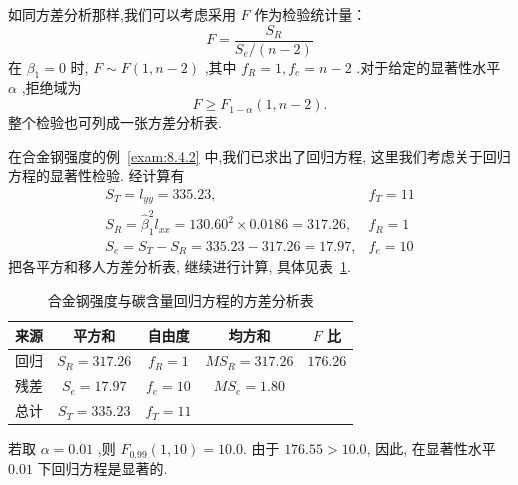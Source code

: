 如同方差分析那样,我们可以考虑采用 $F$ 作为检验统计量：
\begin{equation*}
F=\frac{S_{R}}{S_{e} /(n-2)}
\end{equation*}
在 $\beta_1=0$ 时, $F\sim F(1,n-2)$ ,其中 $f_R=1,f_e=n-2$ .对于给定的显著性水平 $\alpha$ ,拒绝域为
\begin{equation*} F\ge F_{1-\alpha}(1,n-2).  \end{equation*}
整个检验也可列成一张方差分析表.
\begin{example}\label{exam:8.4.3}
在合金钢强度的例~\ref{exam:8.4.2} 中,我们已求出了回归方程, 这里我们考虑关于回归方程的显著性检验. 经计算有
\begin{equation}
\begin{array}{ll}
{S_{T}=l_{y y}=335.23,} & {f_{T}=11} \\ 
{S_{R}=\hat{\beta}_{1}^{2} l_{x x}=130.60^{2} \times 0.0186=317.26,} & {f_{R}=1} \\ {S_{e}=S_{T}-S_{R}=335.23-317.26=17.97,} & {f_{e}=10}
\end{array}
\end{equation}
把各平方和移人方差分析表, 继续进行计算, 具体见表~\ref{tab:8.4.3}.
\begin{table}[htbp]
  \centering
  \caption{合金钢强度与碳含量回归方程的方差分析表}
  \begin{tabular}{ccccc}
      \toprule
      来源    &  平方和  & 自由度   & 均方和   & $ F$ 比 \\\midrule %
      回归    &  $S_R=317.26$  & $ f_R=1$   &  $MS_R=317.26$  &  $176.26$  \\
      残差    &  $S_e=17.97$  &  $f_e=10$  &  $MS_e=1.80$  &  \\\midrule
      总计    &  $S_T=335.23$  &  $f_T=11$  &       &  \\\bottomrule
  \end{tabular}%
  \label{tab:8.4.3}%
\end{table}%
若取 $\alpha=0.01$ ,则 $F_{0.99}(1,10)=10.0$. 由于 $176.55>10.0$, 因此, 在显著性水平 $0.01$ 下回归方程是显著的.
\end{example}

